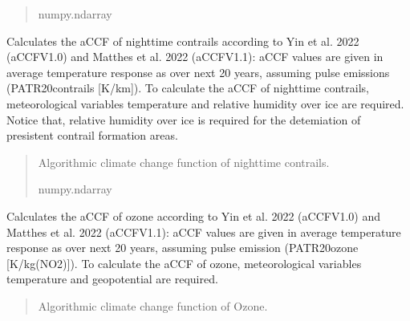 \documentclass[a4paper,11pt,english]{sphinxmanual}
\begin{document}
\begin{fulllineitems}
\begin{fulllineitems}
\begin{quote}
\begin{description}
\sphinxAtStartPar
numpy.ndarray

\end{description}\end{quote}

\end{fulllineitems}


\begin{fulllineitems}
\label{\detokenize{modules:envlib.accf.GeTaCCFs.accf_ncontrail}}
\pysigstartsignatures
{}
\pysigstopsignatures
\sphinxAtStartPar
Calculates the aCCF of night\sphinxhyphen{}time contrails according to Yin et al. 2022 (aCCF\sphinxhyphen{}V1.0) and Matthes et al. 2022 (aCCF\sphinxhyphen{}V1.1): aCCF values are  given in average 
temperature response as over next 20 years, assuming pulse emissions (P\sphinxhyphen{}ATR20\sphinxhyphen{}contrails {[}K/km{]}). To calculate the aCCF of night\sphinxhyphen{}time contrails,
meteorological variables temperature and relative humidity over ice are required. Notice that,
relative humidity over ice is required for the detemiation of presistent contrail formation areas.
\begin{quote}\begin{description}
\sphinxAtStartPar
Algorithmic climate change function of nighttime contrails.

\sphinxAtStartPar
numpy.ndarray

\end{description}\end{quote}

\end{fulllineitems}


\begin{fulllineitems}
\label{\detokenize{modules:envlib.accf.GeTaCCFs.accf_o3}}
\pysigstartsignatures
{}
\pysigstopsignatures
\sphinxAtStartPar
Calculates the aCCF of ozone according to Yin et al. 2022 (aCCF\sphinxhyphen{}V1.0) and Matthes et al. 2022 (aCCF\sphinxhyphen{}V1.1): aCCF values are  given in 
average temperature response as over next 20 years, assuming pulse emission (P\sphinxhyphen{}ATR20\sphinxhyphen{}ozone {[}K/kg(NO2){]}). To calculate the aCCF of ozone, 
meteorological variables temperature and geopotential are required.
\begin{quote}\begin{description}
\sphinxAtStartPar
Algorithmic climate change function of Ozone.


\end{description}
\end{quote}
\end{fulllineitems}
\end{fulllineitems}
\end{document}

